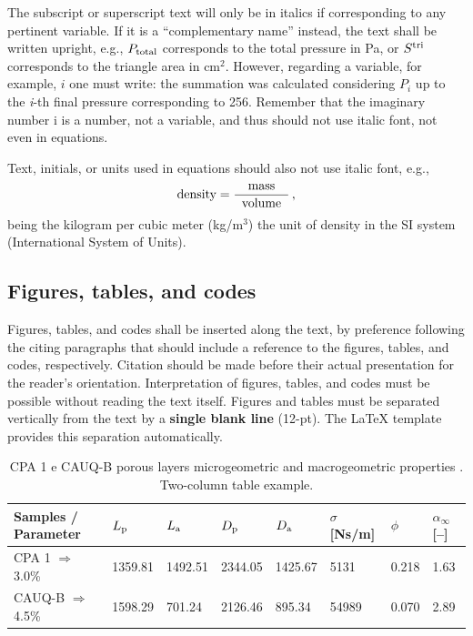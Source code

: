 \documentclass[12pt, a4paper, twoside, twocolumn]{article}
\begin{document}
The subscript or superscript text will only be in italics if corresponding to any pertinent variable. If it is a ``complementary name'' instead, the text shall be written upright, e.g., $P_{\text{total}}$ corresponds to the total pressure in Pa, or $S^{\text{tri}}$ corresponds to the triangle area in cm$^2$. However, regarding a variable, for example, $i$ one must write: the summation was calculated considering $P_i$ up to the \textit{i}-th final pressure corresponding to 256. Remember that the imaginary number i is a number, not a variable, and thus should not use italic font, not even in equations.

Text, initials, or units used in equations should also not use italic font, e.g.,
%
\begin{equation}
	\text{density} = \frac{\text{mass}}{\;\;\text{volume}\;\;}\,,
\label{eq:densidade}
\end{equation}
%
being the kilogram per cubic meter (kg/m$^3$) the unit of density in the SI system (International System of Units).

\subsection{Figures, tables, and codes}

Figures, tables, and codes shall be inserted along the text, by preference following the citing paragraphs that should include a reference to the figures, tables, and codes, respectively. Citation should be made before their actual presentation for the reader's orientation. Interpretation of figures, tables, and codes must be possible without reading the text itself. Figures and tables must be separated vertically from the text by a \textbf{single blank line} (12-pt). The \LaTeX{} template provides this separation automatically.

\begin{table}[!b]
  \centering {} 
  \caption{CPA 1 e CAUQ-B porous layers microgeometric and macrogeometric properties \cite{Mareze-2017}.\\ Two-column table example.}
	\fontsize{11}{12}\selectfont 
    \begin{tabular}{C{2.9cm} | C{1.5cm} | C{1.5cm} | C{1.5cm} | C{1.5cm} | C{1.5cm} | C{1.0cm}| C{1.0cm}}
    \toprule
    \textbf{ Samples / Parameter } & $L_{\text{p}}$ \qquad [$\upmu$\! m] & $L_{\text{a}}$ \qquad [$\upmu$\! m] & $D_{\text{p}}$ \qquad [$\upmu$\! m] & $D_{\text{a}}$ \qquad [$\upmu$\! m] & $\sigma$ [Ns/m] & {$\phi$\quad [--]} & $\alpha_{\infty}$ [--]\\
	  \midrule
		CPA 1 $\Rightarrow$  3.0\% &	1359.81 & 1492.51 & 2344.05 & 1425.67 &	5131 &	0.218 &	1.63\\
		 CAUQ-B $\Rightarrow$ 4.5\%	& 1598.29 &	701.24 & 2126.46 & 895.34 &	54989 &	0.070 &	2.89\\
    \bottomrule
    \end{tabular}
    \label{tab.exemplo}%
\end{table}%
\end{document}
